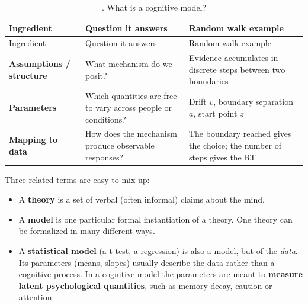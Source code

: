 \begin{longtable}[]{@{}
  >{\raggedright\arraybackslash}p{}
  >{\raggedright\arraybackslash}p{}
  >{\raggedright\arraybackslash}p{}@{}}
\caption{. What is a cognitive model?}\tabularnewline
\toprule\noalign{}
\begin{minipage}[b]{\linewidth}\raggedright
Ingredient
\end{minipage} & \begin{minipage}[b]{\linewidth}\raggedright
Question it answers
\end{minipage} & \begin{minipage}[b]{\linewidth}\raggedright
Random walk example
\end{minipage} \\
\midrule\noalign{}
\endfirsthead
\toprule\noalign{}
\begin{minipage}[b]{\linewidth}\raggedright
Ingredient
\end{minipage} & \begin{minipage}[b]{\linewidth}\raggedright
Question it answers
\end{minipage} & \begin{minipage}[b]{\linewidth}\raggedright
Random walk example
\end{minipage} \\
\midrule\noalign{}
\endhead
\bottomrule\noalign{}
\endlastfoot
\textbf{Assumptions / structure} & What mechanism do we posit? &
Evidence accumulates in discrete steps between two boundaries \\
\textbf{Parameters} & Which quantities are free to vary across people or
conditions? & Drift \(v\), boundary separation \(a\), start point
\(z\) \\
\textbf{Mapping to data} & How does the mechanism produce observable
responses? & The boundary reached gives the choice; the number of steps
gives the RT \\
\end{longtable}

Three related terms are easy to mix up:

\begin{itemize}
\tightlist
\item
  A \textbf{theory} is a set of verbal (often informal) claims about the
  mind.
\item
  A \textbf{model} is one particular formal instantiation of a theory.
  One theory can be formalized in many different ways.
\item
  A \textbf{statistical model} (a t-test, a regression) is also a model,
  but of the \emph{data}. Its parameters (means, slopes) usually
  describe the data rather than a cognitive process. In a cognitive
  model the parameters are meant to \textbf{measure latent psychological
  quantities}, such as memory decay, caution or attention.
\end{itemize}

